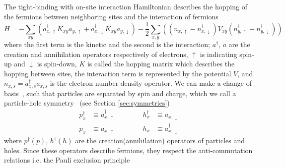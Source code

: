 The tight-binding with on-site interaction Hamiltonian describes the hopping of the fermions between neighboring sites and the interaction of fermions
\begin{equation}
    H = - \sum_{xy} \left( a^\dagger_{x,\uparrow} K_{xy} a_{y,\uparrow} + a^\dagger_{x,\downarrow} K_{xy} a_{y,\downarrow} \right) - \frac{1}{2} \sum_{x,y} \left( (n^\dagger_{x,\uparrow} - n^\dagger_{x,\downarrow}) V_{xy} (n^\dagger_{y,\uparrow} - n^\dagger_{y,\downarrow}) \right)
\end{equation}
where the first term is the kinetic and the second is the interaction; $a^\dagger$, $a$ are the creation and annihilation operators respectively of electrons, $\uparrow$ is indicating spin-up and $\downarrow$ is spin-down, $K$ is called the hopping matrix which describes the hopping between sites, the interaction term is represented by the potential $V$, and $n_{x,s} = a^\dagger_{x,s} a_{x,s}$ is the electron number density operator. We can make a change of basis~\cite{avoiding}, such that particles are separated by spin and charge, which we call a particle-hole symmetry~\cite{phex1} (see Section \ref{sec:symmetries})
\begin{equation}
    \begin{aligned}
        p^\dagger_x & \equiv a^\dagger_{x,\uparrow} \qquad\qquad h^\dagger_x & \equiv a_{x,\downarrow} \\
        p_x & \equiv a_{x,\uparrow} \qquad\qquad h_x & \equiv a^\dagger_{x,\downarrow}
    \end{aligned}
    \label{eq:ph-switch}
\end{equation}
where $p^\dagger (p)$, $h^\dagger (h)$ are the creation(annihilation) operators of particles and holes. Since these operators describe fermions, they respect the anti-commutation relations i.e. the Pauli exclusion principle

